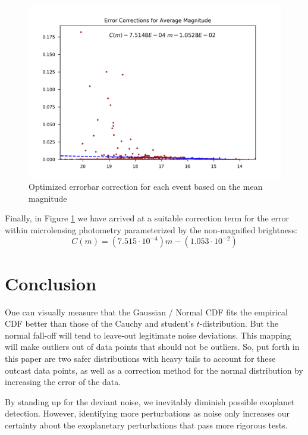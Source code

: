 \documentclass[12pt, a4paper]{article}
\begin{document}
\begin{figure}[H]
\centering
\includegraphics[width=\textwidth]{final}
\caption{Optimized errorbar correction for each event based on the mean magnitude}
\label{fig:final}
\end{figure}

Finally, in Figure \ref{fig:final} we have arrived at a suitable correction term for the error within microlensing photometry parameterized by the non-magnified brightness:
\[
C(m) = (7.515\cdot 10^{-4}) m - (1.053\cdot 10^{-2})
\]

\section{Conclusion}

One can visually measure that the Gaussian / Normal CDF fits the empirical CDF better than those of the Cauchy and student's $t$-distribution.
But the normal fall-off will tend to leave-out legitimate noise deviations.
This mapping will make outliers out of data points that should not be outliers.
So, put forth in this paper are two safer distributions with heavy tails to account for these outcast data points, as well as a correction method for the normal distribution by increasing the error of the data.

By standing up for the deviant noise, we inevitably diminish possible exoplanet detection.
However, identifying more perturbations as noise only increases our certainty about the exoplanetary perturbations that pass more rigorous tests.

\cite{martin}
\cite{paczynski}
\cite{gould_discovering}
\cite{gaudi_parameters}
\cite{PLANET}

\pagebreak


\end{document}
